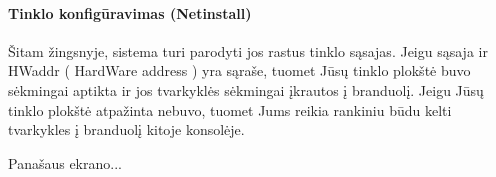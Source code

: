 \documentclass[a4paper]{book}
\begin{document}
  \paragraph{Tinklo konfigūravimas (Netinstall)}

  Šitam žingsnyje, sistema turi parodyti jos rastus tinklo
  sąsajas. Jeigu sąsaja ir HWaddr ( HardWare address ) yra sąraše,
  tuomet Jūsų tinklo plokštė buvo sėkmingai aptikta ir jos tvarkyklės
  sėkmingai įkrautos į branduolį. Jeigu Jūsų tinklo plokštė atpažinta
  nebuvo, tuomet Jums reikia rankiniu būdu kelti tvarkykles į
  branduolį kitoje konsolėje.

  Panašaus ekrano... %
\end{document}

